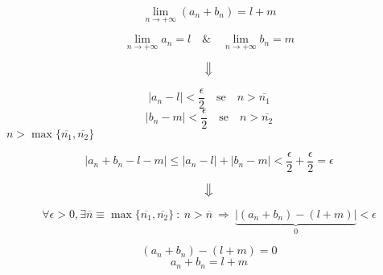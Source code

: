 \begin{dimo}

\begin{equation}
	\lim \limits_{n \to +\infty} (a_n + b_n) = l + m
\end{equation}

\begin{equation}
	\lim \limits_{n \to +\infty} a_n = l \quad \& \quad
	\lim \limits_{n \to +\infty} b_n = m
\end{equation}

\begin{equation*}
	\big\Downarrow
\end{equation*}

\begin{equation}
	| a_n - l | < \frac{\epsilon}{2} \quad \mbox{se}\quad  n > \overline{n_1}
\end{equation}
\begin{equation}
	| b_n - m | < \frac{\epsilon}{2} \quad \mbox{se}\quad  n > \overline{n_2}
\end{equation}
$n> \max\{ \overline{n_1}, \overline{n_2} \}$

\begin{equation}
	| a_n + b_n - l - m | \leq | a_n - l | + | b_n - m | < 
	\frac{\epsilon}{2} + \frac{\epsilon}{2} = \epsilon
\end{equation}

\begin{equation*}
	\big\Downarrow
\end{equation*}

\begin{equation}
	\forall \epsilon > 0, \exists \overline{n} \equiv \max \{
	\overline{n_1}, \overline{n_2} \} \ :\ n > \overline{n}\ 
	\Rightarrow\ \underbrace{| (a_n + b_n) - ( l + m ) |}_{0} < \epsilon
\end{equation}

\begin{equation}
	( a_n + b_n ) - ( l + m ) = 0
\end{equation}
\begin{equation}
	a_n + b_n = l + m
\end{equation}

\end{dimo}

